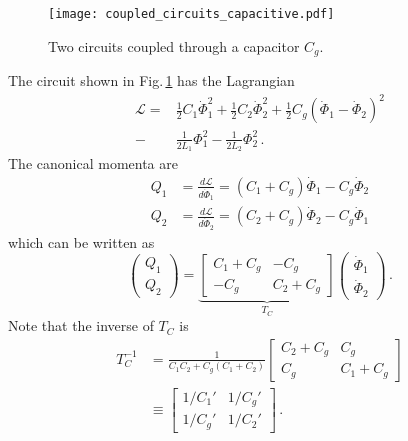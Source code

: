 

\begin{figure}
\begin{centering}
\texttt{[image: coupled\_circuits\_capacitive.pdf]}
\par\end{centering}
\caption{Two circuits coupled through a capacitor $C_g$.}
\label{Fig:coupledCircuits_capacitive}
\end{figure}

The circuit shown in Fig.\,\ref{Fig:coupledCircuits_capacitive} has the Lagrangian
\begin{align}
  \mathcal{L}
  =& \frac{1}{2}C_1\dot{\Phi}_1^2 + \frac{1}{2}C_2\dot{\Phi}_2^2
   + \frac{1}{2}C_g \left( \dot{\Phi}_1 - \dot{\Phi}_2 \right)^2 \nonumber \\
  -& \frac{1}{2L_1}\Phi_1^2 - \frac{1}{2L_2}\Phi_2^2 \, .
\end{align}
The canonical momenta are
\begin{align}
  Q_1 &= \frac{d \mathcal{L}}{d\dot{\Phi}_1} = (C_1 + C_g) \dot{\Phi}_1 - C_g\dot{\Phi}_2 \nonumber \\
  Q_2 &= \frac{d \mathcal{L}}{d\dot{\Phi}_2} = (C_2 + C_g) \dot{\Phi}_2 - C_g\dot{\Phi}_1
\end{align}
which can be written as
\begin{equation}
  \left( \begin{array}{c} Q_1 \\ Q_2 \end{array} \right) =
  \underbrace{
    \left[ \begin{array}{cc} C_1 + C_g & -C_g \\ -C_g & C_2 + C_g \end{array} \right]}_{T_C}
  \left( \begin{array}{c} \dot{\Phi}_1 \\ \dot{\Phi}_2 \end{array} \right)
  \, .
\end{equation}
Note that the inverse of $T_C$ is
\begin{align}
  T_C^{-1}
  &= \frac{1}{C_1 C_2 + C_g (C_1 + C_2)}
    \left[ \begin{array}{cc} C_2 + C_g & C_g \\ C_g & C_1 + C_g \end{array} \right] \nonumber \\
  &\equiv \left[
    \begin{array}{cc} 1/C_1' & 1/C_g' \\ 1/C_g' & 1/C_2' \end{array}
    \right] \, .
\end{align}
